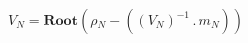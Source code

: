 \documentclass[border=2pt]{standalone}
\begin{document}
${V}{_{N}}=\textbf{Root}\left( {{\rho}}{_{N}}  - \left(\left( {V}{_{N}} \right)^{-1} \, . \, {m}{_{N}}\right)\right)$
\end{document}
